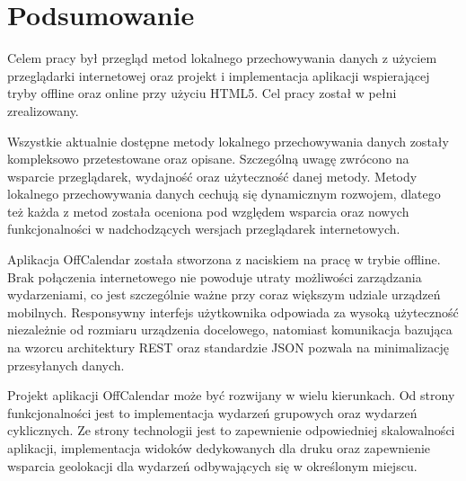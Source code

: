 \chapter{Podsumowanie}
\label{cha:podsumowanie}

Celem pracy był przegląd metod lokalnego przechowywania danych z użyciem przeglądarki internetowej oraz projekt i implementacja aplikacji wspierającej tryby offline oraz online przy użyciu HTML5. Cel pracy został w pełni zrealizowany.

Wszystkie aktualnie dostępne metody lokalnego przechowywania danych zostały kompleksowo przetestowane oraz opisane. Szczególną uwagę zwrócono na wsparcie przeglądarek, wydajność oraz użyteczność danej metody. Metody lokalnego przechowywania danych cechują się dynamicznym rozwojem, dlatego też każda z metod została oceniona pod względem wsparcia oraz nowych funkcjonalności w nadchodzących wersjach przeglądarek internetowych.

Aplikacja OffCalendar została stworzona z naciskiem na pracę w trybie offline. Brak połączenia internetowego nie powoduje utraty możliwości zarządzania wydarzeniami, co jest szczególnie ważne przy coraz większym udziale urządzeń mobilnych. Responsywny interfejs użytkownika odpowiada za wysoką użyteczność niezależnie od rozmiaru urządzenia docelowego, natomiast komunikacja bazująca na wzorcu architektury REST oraz standardzie JSON pozwala na minimalizację przesyłanych danych.

Projekt aplikacji OffCalendar może być rozwijany w wielu kierunkach. Od strony funkcjonalności jest to implementacja wydarzeń grupowych oraz wydarzeń cyklicznych. Ze strony technologii jest to zapewnienie odpowiedniej skalowalności aplikacji, implementacja widoków dedykowanych dla druku oraz zapewnienie wsparcia geolokacji dla wydarzeń odbywających się w określonym miejscu.